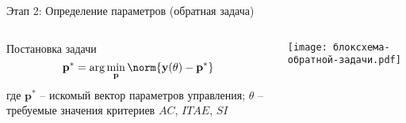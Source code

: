 \begin{frame}{Этап 2: Определение параметров (обратная задача)}
	\begin{columns}
		\begin{column}{0.48\textwidth}
			\vspace{-0.2cm}
			\begin{block}{Постановка задачи}
				\scriptsize
				\begin{equation*}
					\mathbf{p}^* = \arg\min_{\mathbf{p}} \norm{\mathbf{y}(\theta) - \mathbf{p}^*}
				\end{equation*}
				\scriptsize где $\mathbf{p}^*$ -- искомый вектор параметров управления; $\theta$ -- требуемые значения критериев $AC$, $ITAE$, $SI$
			\end{block}


		\end{column}

		\begin{column}{0.52\textwidth}
			\texttt{[image: блоксхема-обратной-задачи.pdf]}
		\end{column}
	\end{columns}
\end{frame}

